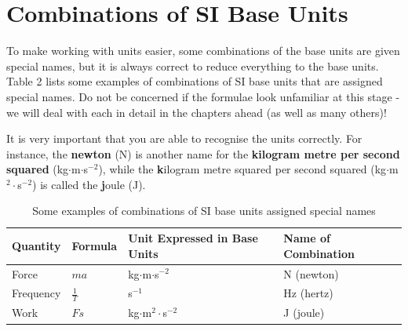     \section{Combinations of SI Base Units}
            \nopagebreak
      \label{m30853*id63104}To make working with units easier, some combinations of the base
units are given special names, but it is always correct to reduce
everything to the base units. Table 2 lists
some examples of combinations of SI base units that are assigned
special names. Do not be concerned if the formulae look unfamiliar
at this stage - we will deal with each in detail in the chapters
ahead (as well as many others)!\par 
      \label{m30853*id63116}It is very important that you are able to recognise the units
correctly. For instance, the \textbf{newton} (N) is another name for
the \textbf{kilogram metre per second squared}
(kg$\ensuremath{\cdot}$m$\ensuremath{\cdot}$s${}^{-2}$), while the \textbf{k}ilogram metre squared
per second squared (kg$\ensuremath{\cdot}$m${}^{2}\ensuremath{\cdot}$s${}^{-2}$) is called the
\textbf{j}oule (J).\par 
          \begin{table}[H]
        \begin{center}
      \label{m30853*uid15}\noindent
      \begin{tabular}{|l|l|l|l|}\hline
                \textbf{Quantity}
               &
                \textbf{Formula}
               &
                \textbf{Unit Expressed in Base Units}
               &
                \textbf{Name of Combination}
              \\ \hline
        Force &
                $ma$
               &
        kg$\ensuremath{\cdot}$m$\ensuremath{\cdot}$s${}^{-2}$ &
        N (newton) \\ \hline
        Frequency &
                $\frac{1}{T}$
               &
        s${}^{-1}$ &
        Hz (hertz) \\ \hline
        Work &
                $Fs$
               &
        kg$\ensuremath{\cdot}$m${}^{2}\ensuremath{\cdot}$s${}^{-2}$ &
        J (joule) \\ \hline
    \end{tabular}
\caption{Some examples of combinations of SI base units assigned special names}
      \end{center}
\end{table}
